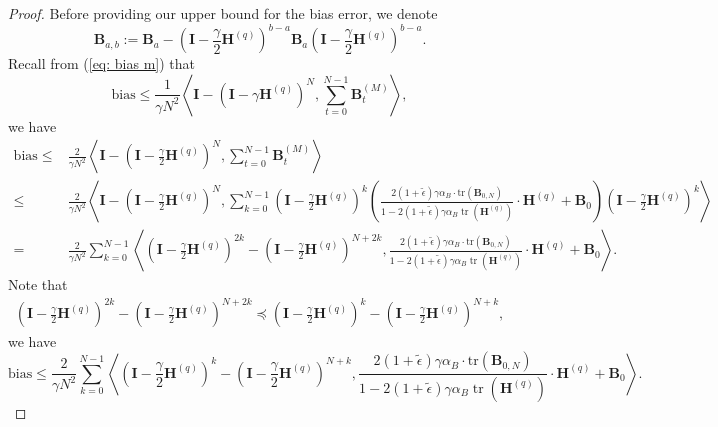 \documentclass[11pt, letterpaper]{article}
\begin{document}
\begin{proof}
    Before providing our upper bound for the bias error, we denote \begin{equation*}
        \mathbf{B}_{a,b}:=\mathbf{B}_a-(\mathbf{I}-\frac{\gamma}{2}\mathbf{H}^{(q)})^{b-a}\mathbf{B}_a(\mathbf{I}-\frac{\gamma}{2}\mathbf{H}^{(q)})^{b-a}.
    \end{equation*}
    Recall from (\ref{eq: bias m}) that
    \begin{equation*}
        \mathrm{bias}\leq \frac{1}{\gamma N^{2}}\left\langle\mathbf{I}-(\mathbf{I}-\gamma\mathbf{H}^{(q)})^{N},\sum_{t=0}^{N-1}\mathbf{B}_{t}^{(M)}\right\rangle,
    \end{equation*}
    we have
    \begin{equation*}
        \begin{aligned}
            \mathrm{bias}\leq &\frac{2}{\gamma N^{2}}\left\langle\mathbf{I}-(\mathbf{I}-\frac{\gamma}{2}\mathbf{H}^{(q)})^{N},\sum_{t=0}^{N-1}\mathbf{B}_{t}^{(M)}\right\rangle\\
            \leq&\frac{2}{\gamma N^{2}}\left\langle\mathbf{I}-(\mathbf{I}-\frac{\gamma}{2}\mathbf{H}^{(q)})^{N},\sum_{k=0}^{N-1}(\mathbf{I}-\frac{\gamma}{2}\mathbf{H}^{(q)})^k\left(\frac{2(1+\tilde{\epsilon})\gamma\alpha_B\cdot\mathrm{tr}\left(\mathbf{B}_{0,N}\right)}{1-2(1+\tilde{\epsilon})\gamma\alpha_B\operatorname{tr}(\mathbf{H}^{(q)})}\cdot\mathbf{H}^{(q)}+\mathbf{B}_{0}\right)(\mathbf{I}-\frac{\gamma}{2}\mathbf{H}^{(q)})^k\right\rangle\\
            =&\frac{2}{\gamma N^{2}}\sum_{k=0}^{N-1}\left\langle(\mathbf{I}-\frac{\gamma}{2}\mathbf{H}^{(q)})^{2k}-(\mathbf{I}-\frac{\gamma}{2}\mathbf{H}^{(q)})^{N+2k},\frac{2(1+\tilde{\epsilon})\gamma\alpha_B\cdot\mathrm{tr}\left(\mathbf{B}_{0,N}\right)}{1-2(1+\tilde{\epsilon})\gamma\alpha_B\operatorname{tr}(\mathbf{H}^{(q)})}\cdot\mathbf{H}^{(q)}+\mathbf{B}_{0}\right\rangle.
        \end{aligned}
    \end{equation*}
    Note that 
    \begin{equation*}
        \begin{aligned}
            (\mathbf{I}-\frac{\gamma}{2}\mathbf{H}^{(q)})^{2k}-(\mathbf{I}-\frac{\gamma}{2}\mathbf{H}^{(q)})^{N+2k}  \preceq(\mathbf{I}-\frac{\gamma}{2}\mathbf{H}^{(q)})^{k}-(\mathbf{I}-\frac{\gamma}{2}\mathbf{H}^{(q)})^{N+k},
        \end{aligned}
    \end{equation*}
    we have
    \begin{equation*}
        \mathrm{bias}\leq \frac{2}{\gamma N^{2}}\sum_{k=0}^{N-1}\left\langle(\mathbf{I}-\frac{\gamma}{2}\mathbf{H}^{(q)})^{k}-(\mathbf{I}-\frac{\gamma}{2}\mathbf{H}^{(q)})^{N+k},\frac{2(1+\tilde{\epsilon})\gamma\alpha_B\cdot\mathrm{tr}\left(\mathbf{B}_{0,N}\right)}{1-2(1+\tilde{\epsilon})\gamma\alpha_B\operatorname{tr}(\mathbf{H}^{(q)})}\cdot\mathbf{H}^{(q)}+\mathbf{B}_{0}\right\rangle.
    \end{equation*}


\end{proof}
\end{document}
